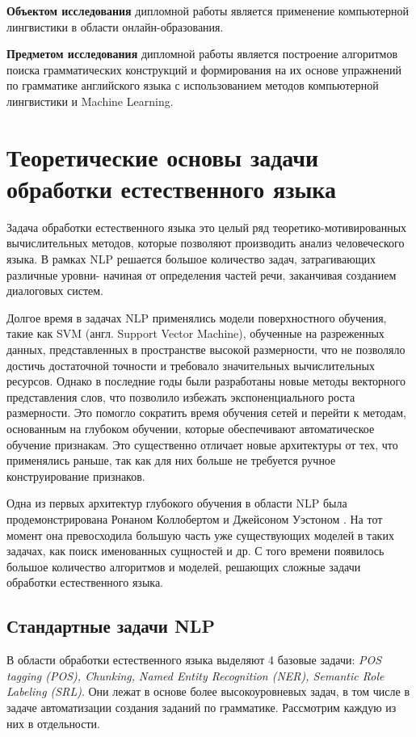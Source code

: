 \textbf{Объектом исследования} дипломной работы является применение компьютерной лингвистики в области онлайн-образования.

\textbf{Предметом исследования} дипломной работы является построение алгоритмов поиска грамматических конструкций и формирования на их основе упражнений по грамматике английского языка с использованием методов компьютерной лингвистики и Machine Learning.

\newpage
\section{Теоретические основы задачи обработки естественного языка}
\label{sec:theory}

Задача обработки естественного языка это целый ряд теоретико-мотивированных вычислительных методов, которые позволяют производить анализ человеческого языка. В рамках NLP решается большое количество задач, затрагивающих различные уровни- начиная от определения частей речи, заканчивая созданием диалоговых систем.

Долгое время в задачах NLP применялись модели поверхностного обучения, такие как SVM (англ. Support Vector Machine), обученные на разреженных данных, представленных в пространстве высокой размерности, что не позволяло достичь достаточной точности и требовало значительных вычислительных ресурсов. Однако в последние годы были разработаны новые методы векторного представления слов, что позволило избежать экспоненциального роста размерности. Это помогло сократить время обучения сетей и перейти к методам, основанным на глубоком обучении, которые обеспечивают автоматическое обучение признакам. Это существенно отличает новые архитектуры от тех, что применялись раньше, так как для них больше не требуется ручное конструирование признаков.

Одна из первых архитектур глубокого обучения в области NLP была продемонстрирована Ронаном Коллобертом и Джейсоном Уэстоном \autocite{DBLP:journals/corr/abs-1103-0398}. На тот момент она превосходила большую часть уже существующих моделей в таких задачах, как поиск именованных сущностей и др. С того времени появилось большое количество алгоритмов и моделей, решающих сложные задачи обработки естественного языка.

\subsection{Стандартные задачи NLP}
\label{subsec:standard}
В области обработки естественного языка выделяют 4 базовые задачи:\emph{ POS tagging (POS), Chunking, Named Entity Recognition (NER), Semantic Role Labeling (SRL)}. Они лежат в основе более высокоуровневых задач, в том числе в задаче автоматизации создания заданий по грамматике. Рассмотрим каждую из них в отдельности.
